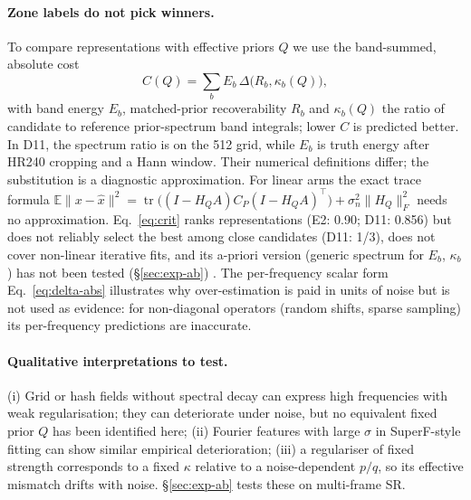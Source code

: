\paragraph{Zone labels do not pick winners.} To compare representations with
effective priors $Q$ we use the band-summed, absolute cost
\begin{equation}\label{eq:crit}
C(Q)=\sum_b E_b\,\Delta\big(R_b,\kappa_b(Q)\big),
\end{equation}
with band energy $E_b$, matched-prior recoverability $R_b$ and
$\kappa_b(Q)$ the ratio of candidate to reference prior-spectrum band integrals; lower $C$
is predicted better. In D11, the spectrum ratio is on the 512 grid, while $E_b$ is truth energy after HR240 cropping and a Hann window. Their numerical definitions differ; the substitution is a diagnostic approximation. For linear arms the exact trace formula
$\mathbb{E}\|x-\hat x\|^2=\operatorname{tr}\!\big((I-H_QA)C_P(I-H_QA)^\top\big)+\sigma_n^2\|H_Q\|_F^2$
needs no approximation. Eq.~\eqref{eq:crit} ranks representations
(E2: 0.90; D11: 0.856) but does not reliably select the best among close
candidates (D11: 1/3), does not cover non-linear iterative fits, and its
a-priori version (generic spectrum for $E_b$, $\kappa_b$) has not been tested
(\S\ref{sec:exp-ab}) . The per-frequency scalar form
Eq.~\eqref{eq:delta-abs} illustrates why over-estimation is paid in units of
noise but is not used as evidence: for non-diagonal operators (random shifts,
sparse sampling) its per-frequency predictions are inaccurate.

\paragraph{Qualitative interpretations to test.}
(i) Grid or hash fields without spectral decay can express high frequencies with weak regularisation; they can deteriorate under noise, but no equivalent fixed prior $Q$ has been identified here;
(ii) Fourier features with large $\sigma$ in SuperF-style fitting can show similar empirical deterioration;
(iii) a regulariser of fixed strength corresponds to a fixed $\kappa$ relative
to a noise-dependent $p/q$, so its effective mismatch drifts with noise.
\S\ref{sec:exp-ab} tests these on multi-frame SR.

